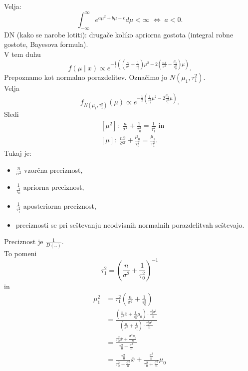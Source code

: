 \documentclass[a4paper, 12pt]{book}
\theoremstyle{definition}
\theoremstyle{remark}
\begin{document}
Velja:
\begin{equation*}
  \int_{-\infty}^{\infty} e^{a \mu^2 + b \mu + c} d\mu < \infty \; \iff \; a < 0.
\end{equation*}
DN (kako se narobe lotiti): drugače koliko apriorna gostota (integral robne gostote, Bayesova formula). \\
V tem duhu
\begin{equation*}
  f(\mu \mid x) \propto e^{-\frac{1}{2} \left(\left(\frac{n}{\sigma^2} + \frac{1}{\tau_0^2}\right) \mu^2 -
  2 \left(\frac{n \overline{x}}{\sigma^2} - \frac{\mu_0}{\tau_0^2}\right) \mu\right)}.
\end{equation*}
Prepoznamo kot normalno porazdelitev.
Označimo jo $N(\mu_1, \tau_1^2)$. \\
Velja
\begin{equation*}
  f_{N(\mu_1, \tau_1^2)}(\mu) \propto e^{-\frac{1}{2} \left(\frac{1}{\tau_1^2} \mu^2 - 2 \frac{\mu_2}{\tau_1^2} \mu\right)}.
\end{equation*}
Sledi
\begin{align*}
  &[\mu^2]: \; \frac{n}{\sigma^2} + \frac{1}{\tau_0^2} = \frac{1}{\tau_1^2} \text{ in} \\
  &[\mu]: \; \frac{n \overline{x}}{\sigma^2} + \frac{\mu_0}{\tau_0^2} = \frac{\mu_1}{\tau_1^2}.
\end{align*}
Tukaj je:
\begin{itemize}
  \item $\frac{n}{\sigma^2}$ vzorčna preciznost,
  \item $\frac{1}{\tau_0^2}$ apriorna preciznost,
  \item $\frac{1}{\tau_1^2}$ aposteriorna preciznost,
  \item preciznosti se pri seštevanju neodvisnih normalnih porazdelitvah seštevajo.
\end{itemize}
Preciznost je $\frac{1}{D(..)}$. \\
To pomeni
\begin{equation*}
  \tau_1^2 = (\frac{n}{\sigma^2} + \frac{1}{\tau_0^2})^{-1}
\end{equation*}
in
\begin{align*}
  \mu_1^2 &= \tau_1^2 (\frac{n}{\sigma^2} + \frac{1}{\tau_0^2}) \\
  &= \frac{(\frac{n}{\sigma^2} \overline{x} + \frac{1}{\tau_0^2} \mu_0) \cdot \frac{\tau_0^2 \sigma^2}{n}}
    {(\frac{n}{\sigma^2} + \frac{1}{\tau_1^2}) \cdot \frac{\tau_0^2 \sigma^2}{n}} \\
  &= \frac{\tau_0^2 \overline{x} + \frac{\sigma^2 \mu_0}{n}}{\tau_0^2 + \frac{\sigma^2}{n}} \\
  &= \frac{\tau_0^2}{\tau_0^2 + \frac{\sigma^2}{n}} \overline{x} +
    \frac{\frac{\sigma^2}{n}}{\tau_0^2 + \frac{\sigma^2}{n}} \mu_0
\end{align*}
\end{document}
